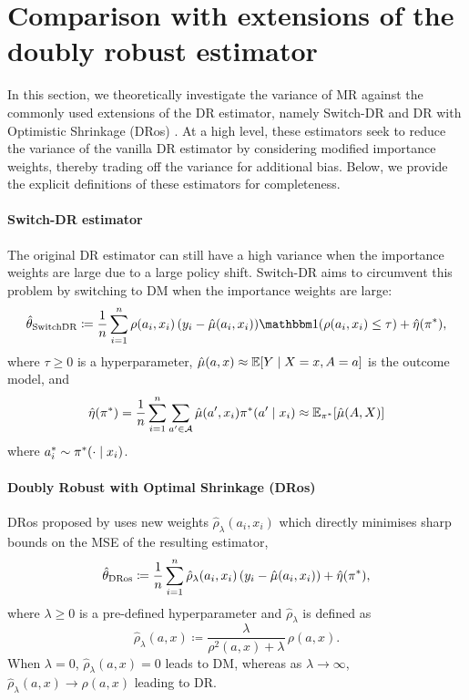 \section{Comparison with extensions of the doubly robust estimator}\label{sec:dr-extensions}
In this section, we theoretically investigate the variance of MR against the commonly used extensions of the DR estimator, namely Switch-DR \citep{wang2017optimal} and DR with Optimistic Shrinkage (DRos) \citep{su2020doubly}. At a high level, these estimators seek to reduce the variance of the vanilla DR estimator by considering modified importance weights, thereby trading off the variance for additional bias.
Below, we provide the explicit definitions of these estimators for completeness.

\paragraph{Switch-DR estimator}
The original DR estimator can still have a high variance when the importance weights are large due to a large policy shift. Switch-DR \citep{wang2017optimal} aims to circumvent this problem by switching to DM when the importance weights are large:
\[
\thetaswitch \coloneqq \frac{1}{n} \sum_{i=1}^n \rho(a_i, x_i)\,(y_i - \hat{\mu}(a_i, x_i))\ind(\rho(a_i, x_i) \leq \tau) + \hat{\eta}(\tar),
\]
where $\tau \geq 0$ is a hyperparameter, $\hat{\mu}(a, x) \approx \mathbb{E}[Y \mid X=x, A=a]$ is the outcome model, and 
$$
\hat{\eta}(\pi^*) = \frac{1}{n} \sum_{i=1}^n \sum_{a'\in \mathcal{A}} \hat{\mu}(a', x_i) \pi^*(a'\mid x_i) \approx \mathbb{E}_{\pi^*}[\hat{\mu}(A, X)]
$$
where $a_i^* \sim \pi^*(\cdot \mid x_i)$.

\paragraph{Doubly Robust with Optimal Shrinkage (DRos)}
DRos proposed by \citep{su2020doubly} uses new weights $\hat{\rho}_\lambda(a_i, x_i)$ which directly minimises sharp bounds on the MSE of the resulting estimator,
\[
\hat{\theta}_{\textup{DRos}} \coloneqq \frac{1}{n} \sum_{i=1}^n \hat{\rho}_\lambda(a_i, x_i)\,(y_i - \hat{\mu}(a_i, x_i)) + \hat{\eta}(\pi^*),
\]
where $\lambda \geq 0$ is a pre-defined hyperparameter and $\hat{\rho}_\lambda$ is defined as
\[
\hat{\rho}_\lambda(a, x) \coloneqq \frac{\lambda}{\rho^2(a, x) + \lambda}\, \rho(a, x).
\]
When $\lambda = 0$, $\hat{\rho}_\lambda(a, x) = 0$ leads to DM, whereas as $\lambda \rightarrow \infty$, $\hat{\rho}_\lambda(a, x) \rightarrow \rho(a, x)$ leading to DR.

